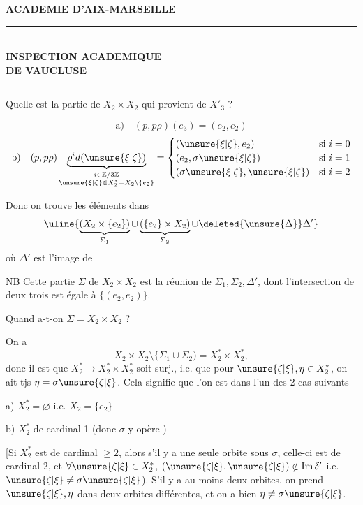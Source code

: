 
\textbf{ACADEMIE D'AIX-MARSEILLE}\\
\rule{3cm}{.4pt}\\
\textbf{INSPECTION ACADEMIQUE}\\
\textbf{DE VAUCLUSE}\\
\rule{1cm}{.4pt}

Quelle est la partie de $X_2\times X_2$ qui provient de $X'_3$ ?

\[
\text{a)}\quad(p,p\rho)(e_3)=(e_2,e_2)
\]
\[
\text{b)}\quad(p,p\rho)\underbrace{\rho^i d(\unsure{\xi|\zeta})}_{\substack{i\in\mathbb Z/3\mathbb Z\\\unsure{\xi|\zeta}\in X_2^*=X_2\setminus\{e_2\}}}
=\begin{cases}
(\unsure{\xi|\zeta},e_2)&\text{si }i=0\\
(e_2,\sigma\unsure{\xi|\zeta})&\text{si }i=1\\
(\sigma\unsure{\xi|\zeta},\unsure{\xi|\zeta})&\text{si }i=2
\end{cases}
\]

Donc on trouve les éléments  dans
\[
\uline{\underbrace{(X_2\times\{e_2\})}_{\Sigma_1}\cup\underbrace{(\{e_2\}\times X_2)}_{\Sigma_2}\cup\deleted{\unsure{\Delta}}\Delta'}
\]
où $\Delta'$ est l'image de

\uline{NB} Cette partie $\Sigma$ de $X_2\times X_2$ est la réunion de $\Sigma_1,\Sigma_2,\Delta'$, dont l'intersection de deux  trois est égale à $\{(e_2,e_2)\}$.

Quand a-t-on $\Sigma=X_2\times X_2$ ?

 On a
\[
X_2\times X_2\setminus\{\Sigma_1\cup\Sigma_2)=X_2^*\times X_2^*,
\]
donc il est  que $X_2^*\longrightarrow X_2^*\times X_2^*$ soit surj., i.e. que pour $\unsure{\zeta|\xi},\eta\in X_2^*$, on ait tjs $\eta=\sigma\unsure{\zeta|\xi}$. Cela signifie que l'on est dans l'un des 2 cas suivants

a) $X_2^*=\varnothing$ i.e. $X_2=\{e_2\}$

b) $X_2^*$ de cardinal 1 (donc $\sigma$  y opère )


[Si $X_2^*$ est de cardinal $\geq2$, alors s'il y a une seule orbite sous $\sigma$, celle-ci est de cardinal 2, et \deleted{$\unsure{\xi}$} $\forall\unsure{\zeta|\xi}\in X_2^*$, $(\unsure{\zeta|\xi},\unsure{\zeta|\xi})\notin\operatorname{Im}\delta'$ i.e. $\unsure{\zeta|\xi}\ne\sigma\unsure{\zeta|\xi}$). S'il y a  au moins deux orbites, on prend $\unsure{\zeta|\xi},\eta$ dans deux orbites différentes, et on a bien $\eta\ne\sigma\unsure{\zeta|\xi}$.

